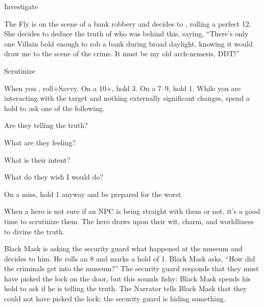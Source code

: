 \begin{movedef}{Investigate}
{    \begin{example}
      The Fly is on the scene of a bank robbery and decides to
      , rolling a perfect 12.
      She decides to deduce the truth of who was behind
      this, saying, ``There's only
      one Villain bold enough to rob a bank during broad daylight,
      knowing it would draw me to the scene of the crime.
      It must be my old arch-nemesis, DDT!''
    \end{example}
  }
\end{movedef}

\begin{movedef}{Scrutinize}
  {
  When you ,  roll+Savvy. On a 10+, hold 3. On a 7--9, hold 1. While you are interacting with the target and nothing externally significant changes, spend a hold to ask one of the following.
  \begin{choices}
    \item Are they telling the truth?
    \item What are they feeling?
    \item What is their intent?
    \item What do they wish I would do?
    \end{choices}
    On a miss, hold 1 anyway and be prepared for the worst.
  }
  {
    When a hero is not sure if an NPC is being straight with them or not,
    it's a good time to scrutinize them. The hero draws upon their
    wit, charm, and worldliness to divine the truth.

    \begin{example}
      Black Mask is asking the security guard what happened
      at the museum and decides to  him.
      He rolls an 8 and marks a hold of 1. Black Mask asks,
      ``How did the criminals get into the museum?''
      The security guard responds that they must have picked the lock
      on the door, but this sounds fishy: Black Mask spends his
      hold to ask if he is telling the truth.
      The Narrator tells Black Mask that they could not have
      picked the lock: the security guard is hiding something.
    \end{example}
  }
\end{movedef}

